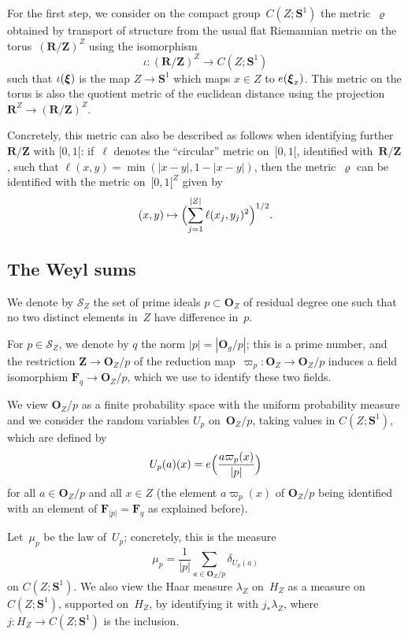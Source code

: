 \documentclass[12pt]{amsart}
\renewcommand{\mathcal}{\mathscr}
\newcommand{\uple}[1]{\text{\boldmath${#1}$}}
\newcommand{\Oo}{\mathbf{O}}
\newcommand{\Zz}{\mathbf{Z}}
\newcommand{\Rr}{\mathbf{R}}
\newcommand{\Ss}{\mathbf{S}}
\newcommand{\Ff}{\mathbf{F}}
\renewcommand{\rho}{\varrho}
\theoremstyle{plain}
\theoremstyle{remark}
\theoremstyle{definition}
\newcommand{\mcS}{\mathcal{S}}
\begin{document}
For the first step, we consider on the compact group~$C(Z;\Ss^1)$ the
metric~$\rho$ obtained by transport of structure from the usual
flat Riemannian metric on the torus~$(\Rr/\Zz)^{Z}$ using the
isomorphism
\[
  \iota\colon (\Rr/\Zz)^{Z}\to C(Z;\Ss^1)
\]
such that $\iota(\uple{\xi})$ is the map $Z\to\Ss^1$ which maps $x\in Z$
to $e(\uple{\xi}_x)$. This metric on the torus is also the quotient
metric of the euclidean distance using the projection
$\Rr^{Z}\to (\Rr/\Zz)^{Z}$.

Concretely, this metric can also be described as follows when
identifying further $\Rr/\Zz$ with $[0,1[$: if~$\ell$ denotes the
``circular'' metric on~$[0,1[$, identified with~$\Rr/\Zz$, such that
$\ell(x,y)=\min(|x-y|,1-|x-y|)$, then the metric~$\rho$ can be
identified with the metric on~$[0,1[^{Z}$ given by
\begin{equation}\label{eq-rhod}
  (x,y)\mapsto \Bigl(\sum_{j=1}^{|Z|}\ell(x_j,y_j)^2\Bigr)^{1/2}.
\end{equation}


\subsection{The Weyl sums}
\label{sec: section vanishing weyl sums}

We denote by $\mcS_Z$ the set of prime ideals $p\subset \Oo_Z$ of
residual degree one such that no two distinct elements in~$Z$ have
difference in~$p$.

For $p\in\mcS_Z$, we denote by $q$ the norm $|p|=|\Oo_g/p|$; this is a
prime number, and the restriction $\Zz\to \Oo_Z/p$ of the reduction
map~$\varpi_{p}\colon \Oo_Z \to \Oo_Z /p$ induces a field isomorphism
$\Ff_q \to \Oo_Z/p$, which we use to identify these two fields.

We view $\Oo_Z/p$ as a finite probability space with the uniform
probability measure and we consider the random variables $U_{p}$
on~$\Oo_Z/p$, taking values in $C(Z;\Ss^1)$, which are defined by
\[
  U_{p}(a)(x)=e\Bigl(\frac{a\varpi_p(x)}{|p|}\Bigr)
\]
for all $a \in \Oo_Z/p$ and all $x \in Z$ (the element $a\varpi_p(x)$ of
$\Oo_Z/p$ being identified with an element of $\Ff_{|p|}=\Ff_q$ as
explained before).

Let~$\mu_p$ be the law of~$U_p$; concretely, this is the measure
$$
\mu_p = \frac{1}{|p|}\sum_{a \in \Oo_Z / p}\delta_{U_p(a)}
$$
on $C(Z; \Ss^1)$. We also view the Haar measure $\lambda_Z$ on~$H_Z$ as
a measure on~$C(Z;\Ss^1)$, supported on~$H_Z$, by identifying it with
$j_*\lambda_Z$, where $j\colon H_Z\to C(Z;\Ss^1)$ is the inclusion.
\end{document}

